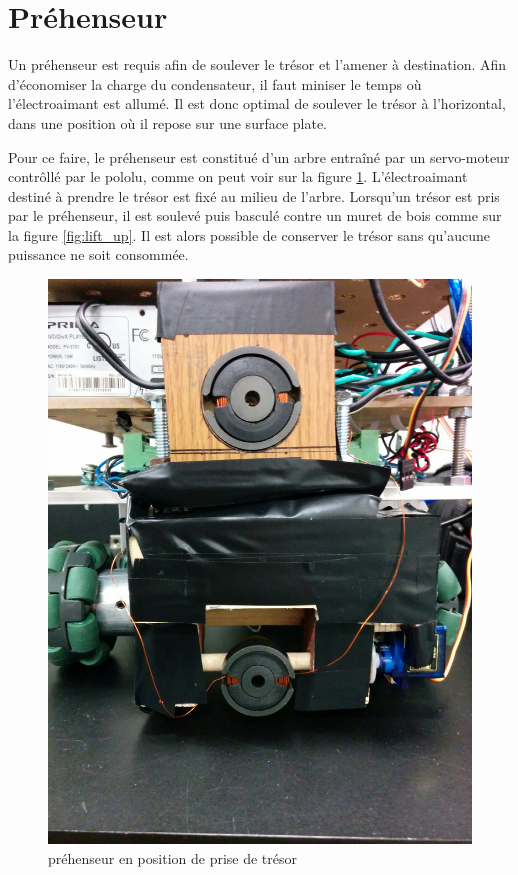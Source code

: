 \section{Préhenseur}

Un préhenseur est requis afin de soulever le trésor et l'amener à destination.
Afin d'économiser la charge du condensateur, il faut miniser le temps où l'électroaimant est allumé.
Il est donc optimal de soulever le trésor à l'horizontal, dans une position où il repose sur une surface plate.

Pour ce faire, le préhenseur est constitué d'un arbre entraîné par un servo-moteur contrôllé par le pololu,
comme on peut voir sur la figure \ref{fig:lift_down}.
L'électroaimant destiné à prendre le trésor est fixé au milieu de l'arbre.
Lorsqu'un trésor est pris par le préhenseur, il est soulevé puis basculé contre un muret de bois comme sur la figure \ref{fig:lift_up}.
Il est alors possible de conserver le trésor sans qu'aucune puissance ne soit consommée.

\begin{figure}[ht]
  \centering
  \includegraphics[scale=0.05]{resources/prehenseur_down.jpg}
  \caption{préhenseur en position de prise de trésor}
  \label{fig:lift_down}
\end{figure}


